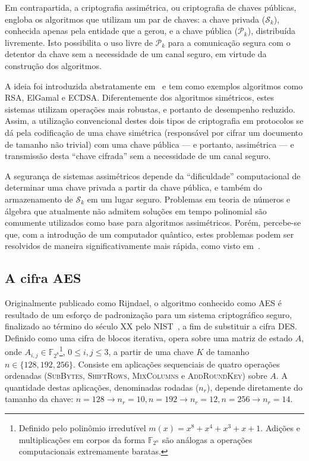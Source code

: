 \documentclass{ufsctex/ufsctex}
\newcommand{\pk}{\mathcal{P}_k}
\newcommand{\sk}{\mathcal{S}_k}
\begin{document}
Em contrapartida, a criptografia assimétrica, ou criptografia de chaves
públicas, engloba os algoritmos que utilizam um par de chaves: a chave privada
($\sk{}$), conhecida apenas pela entidade que a gerou, e a chave pública
($\pk{}$), distribuída livremente. Isto possibilita o uso livre de $\pk{}$ para
a comunicação segura com o detentor da chave sem a necessidade de um canal
seguro, em virtude da construção dos algoritmos.

A ideia foi introduzida abstratamente em~\cite{Diffie:2006:NDC:2263321.2269104}
e tem como exemplos algoritmos como RSA, ElGamal e
ECDSA.
Diferentemente dos algoritmos simétricos, estes sistemas utilizam operações
mais robustas, e portanto de desempenho reduzido. Assim, a utilização
convencional destes dois tipos de criptografia em protocolos se dá pela
codificação de uma chave simétrica (responsável por cifrar um documento de
tamanho não trivial) com uma chave pública --- e portanto, assimétrica --- e
transmissão desta ``chave cifrada'' sem a necessidade de um canal seguro.

A segurança de sistemas assimétricos depende da ``dificuldade'' computacional
de determinar uma chave privada a partir da chave pública, e também do
armazenamento de $\sk{}$ em um lugar seguro. Problemas em teoria de números e
álgebra que atualmente não admitem soluções em tempo polinomial são comumente
utilizados como base para algoritmos assimétricos.  Porém, percebe-se que, com
a introdução de um computador quântico, estes problemas podem ser resolvidos de
maneira significativamente mais rápida, como visto
em~\cite{Shor:1997:PAP:264393.264406}.

\subsection{A cifra AES}\label{subsection:aes}

Originalmente publicado como Rijndael, o algoritmo conhecido como
AES é resultado de um esforço
de padronização para um sistema criptográfico seguro, finalizado ao término do
século XX pelo NIST~\cite{Standards2001}, a fim de substituir a cifra
DES. Definido como uma cifra de
blocos iterativa, opera sobre uma matriz de estado $A$, onde $A_{i, j} \in
\mathbb{F}_{2^{8}}$\footnote{Definido pelo polinômio irredutível $m(x) = x^{8} + x^{4} + x^{3}
+ x + 1$. Adições e multiplicações em corpos da forma $\mathbb{F}_{2^n}$ são
análogas a operações computacionais extremamente baratas.}, $0 \leq i, j \leq
3$, a partir de uma chave $K$ de tamanho $n \in \{128, 192, 256\}$. Consiste em
aplicações sequenciais de quatro operações ordenadas (\textsc{SubBytes},
\textsc{ShiftRows}, \textsc{MixColumns} e \textsc{AddRoundKey}) sobre $A$. A
quantidade destas aplicações, denominadas rodadas ($n_r$), depende diretamente
do tamanho da chave: $n = 128 \rightarrow n_r = 10, n = 192 \rightarrow n_r =
12, n = 256 \rightarrow n_r = 14$.
\end{document}
